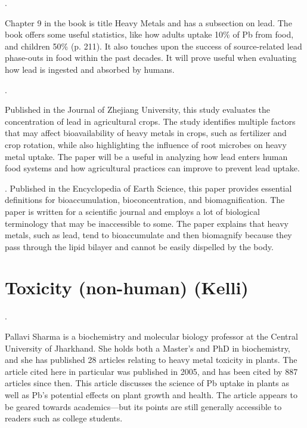 \documentclass{article}
\begin{document}
.

\bigskip

Chapter 9 in the book is title Heavy Metals and has a subsection on lead. The book offers some useful statistics, like how adults uptake 10\% of Pb from food, and children 50\% (p. 211). It also touches upon the success of source-related lead phase-outs in food within the past decades. It will prove useful when evaluating how lead is ingested and absorbed by humans. 

\bigskip

.

\bigskip
Published in the Journal of Zhejiang University, this study evaluates the concentration of lead in agricultural crops. The study identifies multiple factors that may affect bioavailability of heavy metals in crops, such as fertilizer and crop rotation, while also highlighting the influence of root microbes on heavy metal uptake. The paper will be a useful in analyzing how lead enters human food systems and how agricultural practices can improve to prevent lead uptake. 
\bigskip

.
Published in the Encyclopedia of Earth Science, this paper provides essential definitions for bioaccumulation, bioconcentration, and biomagnification. The paper is written for a scientific journal and employs a lot of biological terminology that may be inaccessible to some. The paper explains that heavy metals, such as lead, tend to bioaccumulate and then biomagnify because they pass through the lipid bilayer and cannot be easily dispelled by the body. 


\section{Toxicity (non-human) (Kelli)}

. 
\bigskip

Pallavi Sharma is a biochemistry and molecular biology professor at the Central University of Jharkhand. She holds both a Master's and PhD in biochemistry, and she has published 28 articles relating to heavy metal toxicity in plants. The article cited here in particular was published in 2005, and has been cited by 887 articles since then. 
This article discusses the science of Pb uptake in plants as well as Pb's potential effects on plant growth and health. The article appears to be geared towards academics—but its points are still generally accessible to readers such as college students. 
\end{document}
